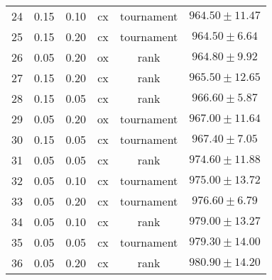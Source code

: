 \begin{table}[h!]
\begin{tabular}{cccccc}
24 & 0.15 & 0.10 & cx & tournament & $964.50 \pm 11.47$ \\ 
25 & 0.15 & 0.20 & cx & tournament & $964.50 \pm 6.64$ \\ 
26 & 0.05 & 0.20 & ox & rank & $964.80 \pm 9.92$ \\ 
27 & 0.15 & 0.20 & cx & rank & $965.50 \pm 12.65$ \\ 
28 & 0.15 & 0.05 & cx & rank & $966.60 \pm 5.87$ \\ 
29 & 0.05 & 0.20 & ox & tournament & $967.00 \pm 11.64$ \\ 
30 & 0.15 & 0.05 & cx & tournament & $967.40 \pm 7.05$ \\ 
31 & 0.05 & 0.05 & cx & rank & $974.60 \pm 11.88$ \\ 
32 & 0.05 & 0.10 & cx & tournament & $975.00 \pm 13.72$ \\ 
33 & 0.05 & 0.20 & cx & tournament & $976.60 \pm 6.79$ \\ 
34 & 0.05 & 0.10 & cx & rank & $979.00 \pm 13.27$ \\ 
35 & 0.05 & 0.05 & cx & tournament & $979.30 \pm 14.00$ \\ 
36 & 0.05 & 0.20 & cx & rank & $980.90 \pm 14.20$ \\ 
\hline 
\end{tabular} 
\end{table}